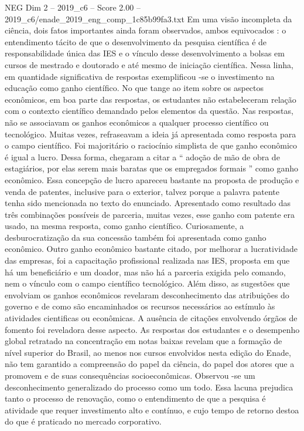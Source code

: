 \begin{textsample}{NEG Dim 2 – 2019\_c6 – Score 2.00 – 2019\_c6/enade\_2019\_eng\_comp\_1c85b99fa3.txt}
Em uma visão incompleta da ciência, dois fatos importantes ainda foram observados, ambos equivocados : o entendimento tácito de que o desenvolvimento da pesquisa científica é de responsabilidade única das IES e o vínculo desse desenvolvimento a bolsas em cursos de mestrado e doutorado e até mesmo de iniciação científica.
Nessa linha, em quantidade significativa de respostas exemplificou -se o investimento na educação como ganho científico.
No que tange ao item sobre os aspectos econômicos, em boa parte das respostas, os estudantes não estabeleceram relação com o contexto científico demandado pelos elementos da questão.
Nas respostas, não se associavam os ganhos econômicos a qualquer processo científico ou tecnológico.
Muitas vezes, refraseavam a ideia já apresentada como resposta para o campo científico.
Foi majoritário o raciocínio simplista de que ganho econômico é igual a lucro.
Dessa forma, chegaram a citar a “ adoção de mão de obra de estagiários, por elas serem mais baratas que os empregados formais ” como ganho econômico.
Essa concepção de lucro apareceu bastante na proposta de produção e venda de patentes, inclusive para o exterior, talvez porque a palavra patente tenha sido mencionada no texto do enunciado.
Apresentado como resultado das três combinações possíveis de parceria, muitas vezes, esse ganho com patente era usado, na mesma resposta, como ganho científico.
Curiosamente, a desburocratização da sua concessão também foi apresentada como ganho econômico.
Outro ganho econômico bastante citado, por melhorar a lucratividade das empresas, foi a capacitação profissional realizada nas IES, proposta em que há um beneficiário e um doador, mas não há a parceria exigida pelo comando, nem o vínculo com o campo científico tecnológico.
Além disso, as sugestões que envolviam os ganhos econômicos revelaram desconhecimento das atribuições do governo e de como são encaminhados os recursos necessários ao estímulo às atividades cientificas ou econômicas.
A ausência de citações envolvendo órgãos de fomento foi reveladora desse aspecto.
As respostas dos estudantes e o desempenho global retratado na concentração em notas baixas revelam que a formação de nível superior do Brasil, ao menos nos cursos envolvidos nesta edição do Enade, não tem garantido a compreensão do papel da ciência, do papel dos atores que a promovem e de suas consequências socioeconômicas.
Observou -se um desconhecimento generalizado do processo como um todo.
Essa lacuna prejudica tanto o processo de renovação, como o entendimento de que a pesquisa é atividade que requer investimento alto e contínuo, e cujo tempo de retorno destoa do que é praticado no mercado corporativo.

\end{textsample}
